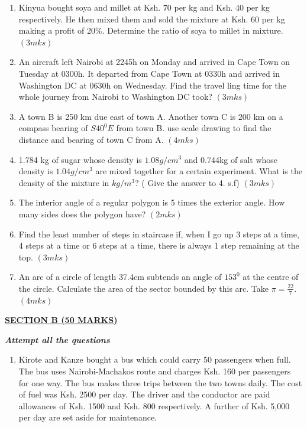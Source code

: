 \documentclass[
  a4paperpaper,
]{scrbook}
\begin{document}
\begin{tcolorbox}
\begin{enumerate}
\def\labelenumi{\arabic{enumi}.}
\setcounter{enumi}{9}
\item
  Kinyua bought soya and millet at Ksh. 70 per kg and Ksh. 40 per kg
  respectively. He then mixed them and sold the mixture at Ksh. 60 per
  kg making a profit of 20\%. Determine the ratio of soya to millet in
  mixture. \((3mks)\)
\item
  An aircraft left Nairobi at 2245h on Monday and arrived in Cape Town
  on Tuesday at 0300h. It departed from Cape Town at 0330h and arrived
  in Washington DC at 0630h on Wednesday. Find the travel ling time for
  the whole journey from Nairobi to Washington DC took? \((3mks)\)
\item
  A town B is 250 km due east of town A. Another town C is 200 km on a
  compass bearing of \(S40^0E\) from town B. use scale drawing to find
  the distance and bearing of town C from A. \((4mks)\)
\item
  1.784 kg of sugar whose density is \(1.08g/cm^3\) and 0.744kg of salt
  whose density is \(1.04g/cm^3\) are mixed together for a certain
  experiment. What is the density of the mixture in \(kg/m^3\)? ( Give
  the answer to 4. s.f) \((3mks)\)
\item
  The interior angle of a regular polygon is 5 times the exterior angle.
  How many sides does the polygon have? \((2mks)\)
\item
  Find the least number of steps in staircase if, when I go up 3 steps
  at a time, 4 steps at a time or 6 steps at a time, there is always 1
  step remaining at the top. \((3mks)\)
\item
  An arc of a circle of length 37.4cm subtends an angle of \(153^0\) at
  the centre of the circle. Calculate the area of the sector bounded by
  this arc. Take \(\pi=\frac{22}{7}\). \((4mks)\)
\end{enumerate}

\ul{\textbf{SECTION B (50 MARKS)}}

\textbf{\emph{Attempt all the questions}}

\begin{enumerate}
\def\labelenumi{\arabic{enumi}.}
\setcounter{enumi}{16}
\item
  Kirote and Kanze bought a bus which could carry 50 passengers when
  full. The bus uses Nairobi-Machakos route and charges Ksh. 160 per
  passengers for one way. The bus makes three trips between the two
  towns daily. The cost of fuel was Ksh. 2500 per day. The driver and
  the conductor are paid allowances of Ksh. 1500 and Ksh. 800
  respectively. A further of Ksh. 5,000 per day are set aside for
  maintenance.


\end{enumerate}
\end{tcolorbox}
\end{document}
